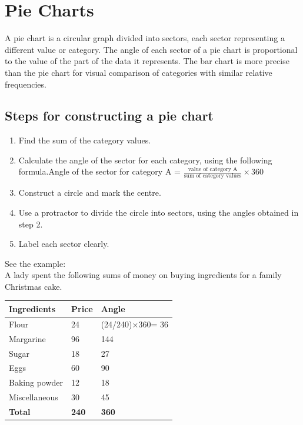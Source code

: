\documentclass[
]{book}
\providecommand{\tightlist}{%
  \setlength{\itemsep}{0pt}\setlength{\parskip}{0pt}}
\begin{document}
\hypertarget{pie-charts}{%
\section{Pie Charts}\label{pie-charts}}

A pie chart is a circular graph divided into sectors, each sector representing a different value or category. The angle of each sector of a pie chart is proportional to the value of the part of the data it represents. The bar chart is more precise than the pie chart for visual comparison of categories with similar relative frequencies.

\hypertarget{steps-for-constructing-a-pie-chart}{%
\subsection{Steps for constructing a pie chart}\label{steps-for-constructing-a-pie-chart}}

\begin{enumerate}
\def\labelenumi{\arabic{enumi}.}
\tightlist
\item
  Find the sum of the category values.\\
\item
  Calculate the angle of the sector for each category, using the following formula.Angle of the sector for category A = \(\frac{\text{value of category A}}{\text{sum of category values}} \times 360\)\\
\item
  Construct a circle and mark the centre.\\
\item
  Use a protractor to divide the circle into sectors, using the angles obtained in step 2.\\
\item
  Label each sector clearly.
\end{enumerate}

See the example:\\
A lady spent the following sums of money on buying ingredients for a family Christmas cake.

\begin{longtable}[]{@{}lll@{}}
\toprule
Ingredients & Price & Angle \\
\midrule
\endhead
Flour & 24 & (24/240)×360= 36 \\
Margarine & 96 & 144 \\
Sugar & 18 & 27 \\
Eggs & 60 & 90 \\
Baking powder & 12 & 18 \\
Miscellaneous & 30 & 45 \\
\textbf{Total} & \textbf{240} & \textbf{360} \\
\bottomrule
\end{longtable}
\end{document}
